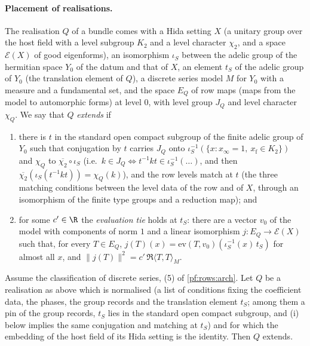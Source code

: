 \paragraph{Placement of realisations.}
The realisation $Q$ of a bundle comes with a Hida setting $X$ (a unitary group over the host field with a level subgroup
$K_2$ and a level character $\chi_2$, and a space $\mathcal E(X)$ of good eigenforms), an isomorphism $\iota_S$ between the adelic
group of the hermitian space $Y_0$ of the datum and that of $X$, an element $t_S$ of the adelic group of $Y_0$ (the
translation element of $Q$), a discrete series model $M$ for $Y_0$ with a measure and a fundamental set, and the space $E_Q$
of row maps (maps from the model to automorphic forms) at level $0$, with level group $J_Q$ and level character $\chi_Q$.
We say that $Q$ \emph{extends} if
\begin{enumerate}[label=(\roman*)]
\item there is $t$ in the standard open compact subgroup of the finite adelic group of $Y_0$ such that conjugation by $t$
carries $J_Q$ onto $\iota_S^{-1}(\{x:x_\infty=1,\ x_{\mathrm f}\in K_2\})$ and $\chi_Q$ to $\overline{\chi_2}\circ\iota_S$
(i.e.\ $k\in J_Q\Leftrightarrow t^{-1}kt\in\iota_S^{-1}(\dots)$, and then $\overline{\chi_2}(\iota_S(t^{-1}kt))=\chi_Q(k)$), and the
row levels match at $t$ (the three matching conditions between the level data of the row and of $X$, through an
isomorphism of the finite type groups and a reduction map); and
\item for some $c'\in\R$ the \emph{evaluation tie} holds at $t_S$: there are a vector $v_0$ of the model with components of norm
$1$ and a linear isomorphism $j:E_Q\to\mathcal E(X)$ such that, for every $T\in E_Q$, $j(T)(x)=\mathrm{ev}(T,v_0)(\iota_S^{-1}(x)\,t_S)$
for almost all $x$, and $\|j(T)\|^2=c'\,\Re\langle T,T\rangle_M$.
\end{enumerate}

\begin{proposition}[Placement]\label{pf:rows:placement}
Assume the classification of discrete series, (5) of \cref{pf:rows:arch}. Let $Q$ be a realisation as above which is
normalised (a list of conditions fixing the coefficient data, the phases, the group records and the translation element $t_S$;
among them a pin of the group records, $t_S$ lies in the standard open compact subgroup, and (i) below implies the same
conjugation and matching at $t_S$) and for which the embedding of the host field of its Hida setting is the identity. Then $Q$
extends.
\end{proposition}

